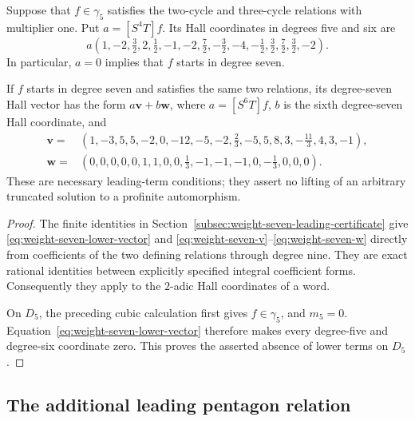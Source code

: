 \begin{lemma}\label{lem:weight-seven-leading-spaces}
Suppose that $f\in\gamma_5$ satisfies the two-cycle and three-cycle
relations with multiplier one. Put $a=[S^4T]f$. Its Hall coordinates
in degrees five and six are
\begin{equation}\label{eq:weight-seven-lower-vector}
 a\left(1,-2,\tfrac32,2,\tfrac12,-1,
 -2,\tfrac72,-\tfrac32,-4,-\tfrac12,\tfrac32,
 \tfrac72,\tfrac32,-2\right).
\end{equation}
In particular, $a=0$ implies that $f$ starts in degree seven.

If $f$ starts in degree seven and satisfies the same two relations,
its degree-seven Hall vector has the form $a\mathbf v+b\mathbf w$,
where $a=[S^6T]f$, $b$ is the sixth degree-seven Hall coordinate, and
\begin{align}
\mathbf v={}&\left(1,-3,5,5,-2,0,-12,-5,-2,\tfrac23,
                  -5,5,8,3,-\tfrac{11}3,4,3,-1\right),
                  \label{eq:weight-seven-v}\\
\mathbf w={}&\left(0,0,0,0,0,1,1,0,0,\tfrac13,
                  -1,-1,-1,0,-\tfrac13,0,0,0\right).
                  \label{eq:weight-seven-w}
\end{align}
These are necessary leading-term conditions; they assert no lifting
of an arbitrary truncated solution to a profinite automorphism.
\end{lemma}

\begin{proof}
The finite identities in Section~\ref{subsec:weight-seven-leading-certificate}
give \eqref{eq:weight-seven-lower-vector} and
\eqref{eq:weight-seven-v}--\eqref{eq:weight-seven-w} directly from
coefficients of the two defining relations through degree nine.
They are exact rational identities between explicitly specified
integral coefficient forms. Consequently they apply to the
$2$-adic Hall coordinates of a word.

On $D_5$, the preceding cubic calculation first gives $f\in\gamma_5$,
and $m_5=0$. Equation~\eqref{eq:weight-seven-lower-vector} therefore
makes every degree-five and degree-six coordinate zero. This proves
the asserted absence of lower terms on $D_5$.
\end{proof}

\subsection{The additional leading pentagon relation}


